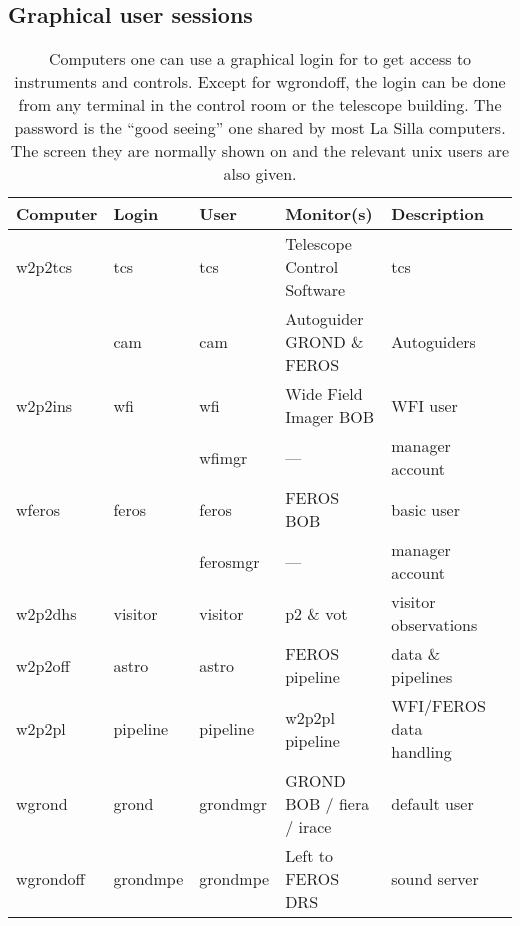 \documentclass[11pt,fleqn,a4paper]{book}
\begin{document}
\subsection{Graphical user sessions}
\begin{table}
    \caption[Main workstations and users]{Computers one can use a graphical login for to get access to instruments and controls. Except for wgrondoff, the login can be done from any terminal in the control room or the telescope building.  The password is the ``good seeing'' one shared by most  La Silla computers. The screen they are normally shown on and the relevant unix users are also given.  }
\label{fig:computers}
\centering
\begin{tabular}{llllll}
\hline
Computer        & Login    & User     & Monitor(s)                 & Description\\\hline\hline
\gls{w2p2tcs}   & tcs      & tcs      & Telescope Control Software & \gls{tcs}\\
                & cam      & cam      & Autoguider GROND \& FEROS  & Autoguiders\\
\gls{w2p2ins}   & wfi      & wfi      & Wide Field Imager BOB      & WFI user\\
                &          & wfimgr   & ---                        & manager account\\
\gls{wferos}    & feros    & feros    & FEROS BOB                  & basic user\\
                &          & ferosmgr & ---                        & manager account\\
\gls{w2p2dhs}   & visitor  & visitor  & p2 \& vot                 & \gls{visitor} observations\\
\gls{w2p2off}   & astro    & astro    & FEROS pipeline             & data \& pipelines\\
\gls{w2p2pl}    & pipeline & pipeline & w2p2pl pipeline            & WFI/FEROS data handling\\       
\gls{wgrond}    & grond    & grondmgr & GROND BOB / \gls{fiera} / \gls{irace}  & default user\\
\hline
\gls{wgrondoff} & grondmpe & grondmpe & Left to FEROS DRS          & sound server\\
\hline
\end{tabular}
\end{table}
\end{document}
